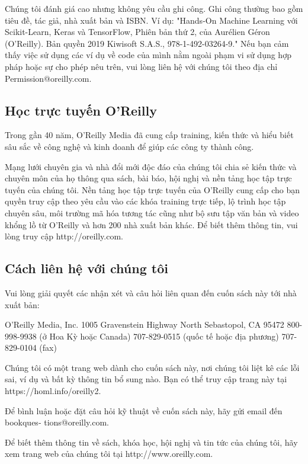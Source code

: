 Chúng tôi đánh giá cao nhưng không yêu cầu ghi công. Ghi công thường bao gồm tiêu đề, tác giả, nhà xuất bản và ISBN. Ví dụ: "Hands-On Machine Learning với Scikit-Learn, Keras và TensorFlow, Phiên bản thứ 2, của Aurélien Géron (O'Reilly). Bản quyền 2019 Kiwisoft S.A.S., 978-1-492-03264-9." Nếu bạn cảm thấy việc sử dụng các ví dụ về code của mình nằm ngoài phạm vi sử dụng hợp pháp hoặc sự cho phép nêu trên, vui lòng liên hệ với chúng tôi theo địa chỉ Permission@oreilly.com.

\subsection{Học trực tuyến O'Reilly}

Trong gần 40 năm, O'Reilly Media đã cung cấp training, kiến ​​thức và hiểu biết sâu sắc về công nghệ và kinh doanh để giúp các công ty thành công.

Mạng lưới chuyên gia và nhà đổi mới độc đáo của chúng tôi chia sẻ kiến ​​thức và chuyên môn của họ thông qua sách, bài báo, hội nghị và nền tảng học tập trực tuyến của chúng tôi. Nền tảng học tập trực tuyến của O'Reilly cung cấp cho bạn quyền truy cập theo yêu cầu vào các khóa training trực tiếp, lộ trình học tập chuyên sâu, môi trường mã hóa tương tác cũng như bộ sưu tập văn bản và video khổng lồ từ O'Reilly và hơn 200 nhà xuất bản khác. Để biết thêm thông tin, vui lòng truy cập http://oreilly.com.

\subsection{Cách liên hệ với chúng tôi}

Vui lòng giải quyết các nhận xét và câu hỏi liên quan đến cuốn sách này tới nhà xuất bản:

O'Reilly Media, Inc. 1005 Gravenstein Highway North Sebastopol, CA 95472 800-998-9938 (ở Hoa Kỳ hoặc Canada) 707-829-0515 (quốc tế hoặc địa phương) 707-829-0104 (fax)

Chúng tôi có một trang web dành cho cuốn sách này, nơi chúng tôi liệt kê các lỗi sai, ví dụ và bất kỳ thông tin bổ sung nào. Bạn có thể truy cập trang này tại https://homl.info/oreilly2.

Để bình luận hoặc đặt câu hỏi kỹ thuật về cuốn sách này, hãy gửi email đến bookques‐ tions@oreilly.com.

Để biết thêm thông tin về sách, khóa học, hội nghị và tin tức của chúng tôi, hãy xem trang web của chúng tôi tại http://www.oreilly.com.

